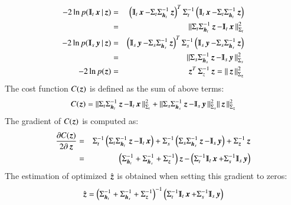 \begin{eqnarray*}
	-2\ln p(\varmathbb{I}_t\mybold{x}|\mybold{z}) =&& \left(\varmathbb{I}_t\mybold{x}-\Sigma_t \Sigma_{\mybold{h}_t}^{-1}\mybold{z} \right)^T \Sigma^{-1}_t \left(\varmathbb{I}_t\mybold{x}-\Sigma_t \Sigma_{\mybold{h}_t}^{-1}\mybold{z}\right) \\
	=&& \Arrowvert \Sigma_t \Sigma_{\mybold{h}_t}^{-1}\mybold{z}-\varmathbb{I}_t\mybold{x} \Arrowvert^2_{\Sigma_t}\\
	-2\ln p(\varmathbb{I}_s\mybold{y}|\mybold{z}) =&&  \left(\varmathbb{I}_s\mybold{y}-\Sigma_s \Sigma_{\mybold{h}_s}^{-1}\mybold{z} \right)^T \Sigma^{-1}_s \left(\varmathbb{I}_s\mybold{y}-\Sigma_s \Sigma_{\mybold{h}_s}^{-1}\mybold{z}\right)\\
	=&& \Arrowvert \Sigma_s \Sigma_{\mybold{h}_s}^{-1}\mybold{z}-\varmathbb{I}_s\mybold{y} \Arrowvert^2_{\Sigma_s}\\
	-2\ln p(\mybold{z}) =&& \mybold{z}^T \Sigma^{-1}_z \mybold{z} = \Arrowvert \mybold{z} \Arrowvert^2_{\Sigma_{\mybold{z}}}
\label{eq:bishop_linear_gaussian_6}
\end{eqnarray*}
The cost function $ C(\operatorname{\boldsymbol{z}}) $ is defined as the sum of above terms:
\begin{equation}
	C(\mybold{z}) =\Arrowvert \Sigma_t \Sigma_{\mybold{h}_t}^{-1}\mybold{z}-\varmathbb{I}_t\mybold{x} \Arrowvert^2_{\Sigma_t}  + \Arrowvert \Sigma_s \Sigma_{\mybold{h}_s}^{-1}\mybold{z}-\varmathbb{I}_s\mybold{y} \Arrowvert^2_{\Sigma_s} \Arrowvert \mybold{z} \Arrowvert^2_{\Sigma_{\mybold{z}}}
\label{eq:bishop_linear_gaussian_7}
\end{equation}
 The gradient of $ C(\operatorname{\boldsymbol{z}}) $ is computed as:
\begin{eqnarray}
	\frac{\partial C(\mybold{z})}{2\partial \mybold{z}} =&& \Sigma^{-1}_t \left( \Sigma_t \Sigma_{\mybold{h}_t}^{-1}\mybold{z}-\varmathbb{I}_t\mybold{x} \right) + \Sigma^{-1}_s \left( \Sigma_s \Sigma_{\mybold{h}_s}^{-1}\mybold{z}-\varmathbb{I}_s\mybold{y} \right) +\Sigma^{-1}_{\mybold{z}} \mybold{z} \nonumber\\
	=&& \left( \Sigma_{\mybold{h}_t}^{-1} + \Sigma_{\mybold{h}_s}^{-1} + \Sigma^{-1}_{\mybold{z}} \right) \mybold{z} - \left( \Sigma^{-1}_t\varmathbb{I}_t\mybold{x} + \Sigma^{-1}_s\varmathbb{I}_s\mybold{y} \right)
\label{eq:bishop_linear_gaussian_8}	
\end{eqnarray}
The estimation of optimized $ \hat{\operatorname{\boldsymbol{z}}} $ is obtained when setting this gradient to zeros:
\begin{equation}
	\hat{\mybold{z}}=\left( \Sigma_{\mybold{h}_t}^{-1} + \Sigma_{\mybold{h}_s}^{-1} + \Sigma^{-1}_{\mybold{z}} \right)^{-1} \left(\Sigma^{-1}_t\varmathbb{I}_t\mybold{x} +\Sigma^{-1}_s\varmathbb{I}_s\mybold{y}\right)
\label{eq:bishop_linear_gaussian_9}
\end{equation}

